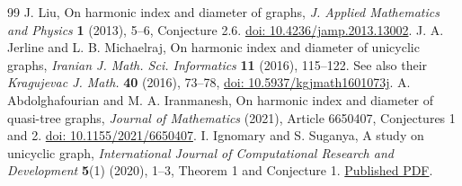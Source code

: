 \documentclass[11pt,a4paper]{article}
\theoremstyle{remark}\newtheorem*{remark}{Remark}
\newcommand{\doi}[1]{\href{https://doi.org/#1}{doi: #1}}
\begin{document}
\begin{thebibliography}{99}
 J. Liu, On harmonic index and diameter of graphs, \emph{J. Applied Mathematics and Physics} \textbf{1} (2013), 5--6, Conjecture 2.6. \doi{10.4236/jamp.2013.13002}.
 J. A. Jerline and L. B. Michaelraj, On harmonic index and diameter of unicyclic graphs, \emph{Iranian J. Math. Sci. Informatics} \textbf{11} (2016), 115--122. See also their \emph{Kragujevac J. Math.} \textbf{40} (2016), 73--78, \doi{10.5937/kgjmath1601073j}.
 A. Abdolghafourian and M. A. Iranmanesh, On harmonic index and diameter of quasi-tree graphs, \emph{Journal of Mathematics} (2021), Article 6650407, Conjectures 1 and 2. \doi{10.1155/2021/6650407}.
 I. Ignomary and S. Suganya, A study on unicyclic graph, \emph{International Journal of Computational Research and Development} \textbf{5}(1) (2020), 1--3, Theorem 1 and Conjecture 1. \href{https://ijcrd.dvpublication.com/uploads/6660177aa9af5_166.pdf}{Published PDF}.
\end{thebibliography}
\end{document}
